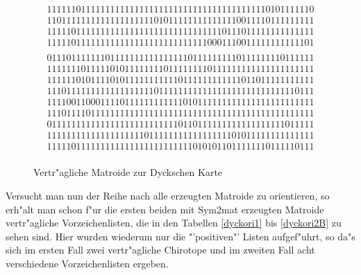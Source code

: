 \begin{figure}
{$$\begin{array}{c}
1111110111111111111111111111111111111111111110101111110\\
1101111111111111111111010111111111111110011110111111111\\
1111101111111111111111111111111111110111011111111111111\\
1111101111111111111111111111111110001110011111111111101\\
\end{array}$$
$$\begin{array}{c}
0111011111110111111111111111101111111110111111110111111\\
1111111011111010111111110111111110111111111111111111111\\
1111110101111010111111111110111111111111011011111111111\\
1110111111111111111111011111111111111111111111111110111\\
1111001100011110111111111111010111111111111111111111111\\
1110111101111111111111111111111111111111111111111111111\\
0111111111111111111111111110110111111111111111111011111\\
1111111111111111111101111111111111111101011111111111111\\
1111101111111111111111111111110101011011111110111110111\\
\end{array}$$}
\caption{Vertr"agliche Matroide zur Dyckschen Karte}
\label{dyckmat}
\end{figure}

Versucht man nun der Reihe nach alle erzeugten Matroide zu orientieren,
so erh"alt man schon f"ur die ersten beiden mit {\sc Sym2mat} erzeugten
Matroide vertr"agliche Vorzeichenlisten, die in den Tabellen \ref{dyckori1}
bis \ref{dyckori2B} zu sehen sind.
Hier wurden wiederum nur die "'positiven"' Listen aufgef"uhrt, so da"s sich
im ersten Fall zwei vertr"agliche Chirotope und im zweiten Fall acht
verschiedene Vorzeichenlisten ergeben.

